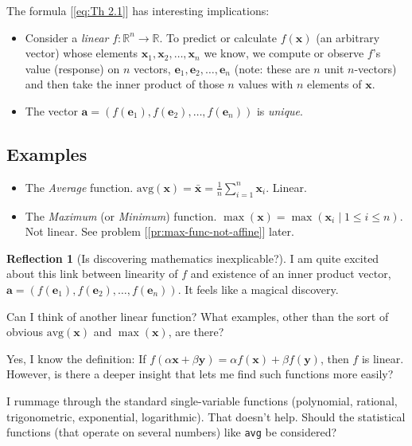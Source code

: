 \documentclass[11pt]{book}
\theoremstyle{definition}
\theoremstyle{plain}
\theoremstyle{problemstyle}
\theoremstyle{remark}
\theoremstyle{definition}
\newtheorem{reflection}{Reflection}
\begin{document}
The formula [\ref{eq:Th 2.1}] has interesting implications:
\begin{itemize}
    \item Consider a \emph{linear} $f:\mathbb{R}^n\rightarrow\mathbb{R}$. To predict or calculate $f(\boldsymbol{x})$ (an arbitrary vector) whose elements $\boldsymbol{x}_1,\boldsymbol{x}_2,\dots,\boldsymbol{x}_n$ we know, we compute or observe $f$'s value (response) on $n$ vectors, $\boldsymbol{e}_1,\boldsymbol{e}_2,\dots,\boldsymbol{e}_n$ (note: these are $n$ unit $n$-vectors) and then take the inner product of those $n$ values with $n$ elements of $\boldsymbol{x}$.  
    \item The vector $\boldsymbol{a}=(f(\boldsymbol{e}_1),f(\boldsymbol{e}_2),\dots,f(\boldsymbol{e}_n))$ is \emph{unique}.
\end{itemize}

\subsection*{Examples}
\label{ss:linear-function-examples}
\begin{itemize}
    \item The \emph{Average} function. $\text{avg}({\boldsymbol{x}})=\bar{\boldsymbol{x}}=\frac{1}{n}\sum_{i=1}^{n}\boldsymbol{x}_i$. Linear.
    \item The \emph{Maximum} (or \emph{Minimum}) function. $\max(\boldsymbol{x})=\max(\boldsymbol{x}_i\mid 1\leq i\leq n)$. Not linear. See problem [\ref{pr:max-func-not-affine}] later.
\end{itemize}

\begin{reflection}[Is discovering mathematics inexplicable?]
    I am quite excited about this link between linearity of $f$ and existence of an inner product vector, $\boldsymbol{a}=(f(\boldsymbol{e}_1),f(\boldsymbol{e}_2),\dots,f(\boldsymbol{e}_n))$. It feels like a magical discovery. 

    Can I think of another linear function? What examples, other than the sort of obvious $\text{avg}(\boldsymbol{x})$ and $\max(\boldsymbol{x})$, are there?

    Yes, I know the definition: If $f(\alpha\boldsymbol{x}+\beta\boldsymbol{y})=\alpha f(\boldsymbol{x})+\beta f(\boldsymbol{y})$, then $f$ is linear. However, is there a deeper insight that lets me find such functions more easily?

    I rummage through the standard single-variable functions (polynomial, rational, trigonometric, exponential, logarithmic). That doesn't help. Should the statistical functions (that operate on several numbers) like \texttt{avg} be considered?
\end{reflection}
\end{document}
